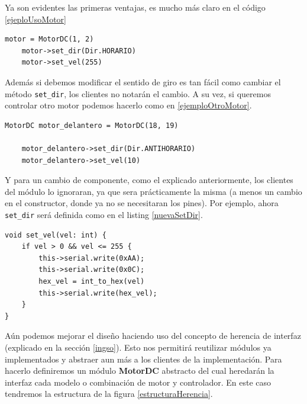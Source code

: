 Ya son evidentes las primeras ventajas, es mucho más claro en el código \ref{ejeploUsoMotor}

\begin{lstlisting}[caption=Ejmplo de uso de la interfaz del módulo MotorDC, label={ejeploUsoMotor}]
	motor = MotorDC(1, 2)
    motor->set_dir(Dir.HORARIO)
    motor->set_vel(255)
\end{lstlisting}

Además si debemos modificar el sentido de giro es tan fácil como cambiar el método \verb|set_dir|, los clientes no notarán el cambio. A su vez, si queremos controlar otro motor podemos hacerlo como en \ref{ejemploOtroMotor}. 

\begin{lstlisting}[caption=Ejemplo control nuevo motor,label={ejemploOtroMotor}]
    MotorDC motor_delantero = MotorDC(18, 19)

    motor_delantero->set_dir(Dir.ANTIHORARIO)
    motor_delantero->set_vel(10)
\end{lstlisting}

Y para un cambio de componente, como el explicado anteriormente, los clientes del módulo lo ignoraran, ya que sera prácticamente la misma (a menos un cambio en el constructor, donde ya no se necesitaran los pines). Por ejemplo, ahora \verb|set_dir| será definida como en el listing \ref{nuevaSetDir}.

\begin{lstlisting}[caption=Nueva definición set\_dir,label={nuevaSetDir}]
void set_vel(vel: int) {
    if vel > 0 && vel <= 255 {
        this->serial.write(0xAA);
        this->serial.write(0x0C);
        hex_vel = int_to_hex(vel)
        this->serial.write(hex_vel);
    }
}
\end{lstlisting}

Aún podemos mejorar el diseño haciendo uso del concepto de herencia de interfaz (explicado en la sección \ref{ingso}). Esto nos permitirá reutilizar módulos ya implementados y abstraer aun más a los clientes de la implementación. Para hacerlo definiremos un módulo \textbf{MotorDC} abstracto del cual heredarán la interfaz cada modelo o combinación de motor y controlador. En este caso tendremos la estructura de la figura \ref{estructuraHerencia}.

